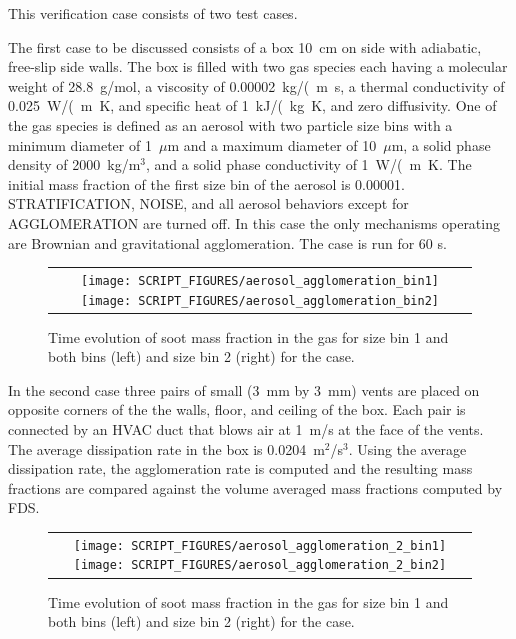 \documentclass[11pt]{book}
\begin{document}
This verification case consists of two test cases.

The first case to be discussed consists of a box 10~cm on side with adiabatic, free-slip side walls. The box is filled with two gas species each having a molecular weight of 28.8~g/mol, a viscosity of 0.00002~\si{kg/(m.s}, a thermal conductivity of 0.025~\si{W/(m.K}, and specific heat of 1~\si{kJ/(kg.K}, and zero diffusivity. One of the gas species is defined as an aerosol with two particle size bins with a minimum diameter of 1~$\mu$m and a maximum diameter of 10~$\mu$m, a solid phase density of 2000~kg/m$^3$, and a solid phase conductivity of 1~\si{W/(m.K}. The initial mass fraction of the first size bin of the aerosol is 0.00001. {\ct STRATIFICATION}, {\ct NOISE}, and all aerosol behaviors except for {\ct AGGLOMERATION} are turned off. In this case the only mechanisms operating are Brownian and gravitational agglomeration. The case is run for 60 s.

\begin{figure}[ht]
	\centering
	\begin{tabular}{c}
		\texttt{[image: SCRIPT\_FIGURES/aerosol\_agglomeration\_bin1]}
		\texttt{[image: SCRIPT\_FIGURES/aerosol\_agglomeration\_bin2]}
	\end{tabular}
	\caption[Gas phase soot mass fractions the  cases]{Time evolution of soot mass fraction in the gas for size bin 1 and both bins (left) and size bin 2 (right) for the  case.}
	\label{fig:agglomeration}
\end{figure}

In the second case three pairs of small (3~mm by 3~mm) vents are placed on opposite corners of the the walls, floor, and ceiling of the box. Each pair is connected by an HVAC duct that blows air at 1~m/s at the face of the vents. The average dissipation rate in the box is 0.0204~m$^2$/s$^3$. Using the average dissipation rate, the agglomeration rate is computed and the resulting mass fractions are compared against the volume averaged mass fractions computed by FDS.

\begin{figure}[ht]
	\centering
	\begin{tabular}{c}
		\texttt{[image: SCRIPT\_FIGURES/aerosol\_agglomeration\_2\_bin1]}
		\texttt{[image: SCRIPT\_FIGURES/aerosol\_agglomeration\_2\_bin2]}
	\end{tabular}
	\caption[Gas phase soot mass fractions the  cases]{Time evolution of soot mass fraction in the gas for size bin 1 and both bins (left) and size bin 2 (right) for the  case.}
	\label{fig:agglomeration_2}
\end{figure}
\end{document}
